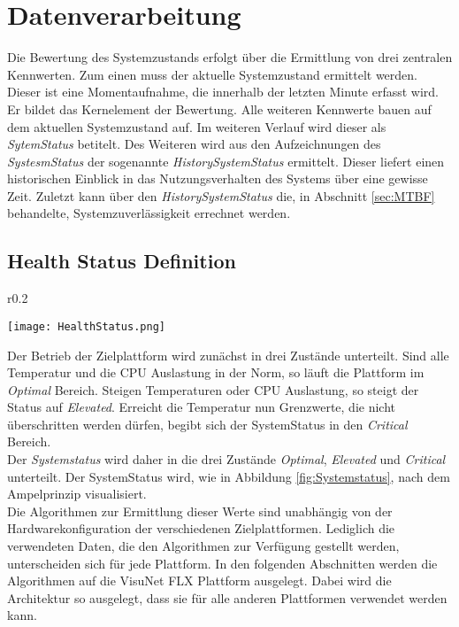 \newpage
\section{Datenverarbeitung}\label{sec:Datenverarbeitung}
Die Bewertung des Systemzustands erfolgt über die Ermittlung von drei zentralen Kennwerten. Zum einen muss der aktuelle Systemzustand ermittelt werden. Dieser ist eine Momentaufnahme, die innerhalb der letzten Minute erfasst wird. Er bildet das Kernelement der Bewertung. Alle weiteren Kennwerte bauen auf dem aktuellen Systemzustand auf. Im weiteren Verlauf wird dieser als \textit{SytemStatus} betitelt. Des Weiteren wird aus den Aufzeichnungen des \textit{SystesmStatus} der sogenannte \textit{HistorySystemStatus} ermittelt. Dieser liefert einen historischen Einblick in das Nutzungsverhalten des Systems über eine gewisse Zeit. Zuletzt kann über den \textit{HistorySystemStatus} die, in Abschnitt \ref{sec:MTBF} behandelte, Systemzuverlässigkeit errechnet werden.
\subsection{Health Status Definition}
\begin{wrapfigure}{r}{0.2\textwidth}
    \vspace{-1.2cm}
    \captionsetup{justification=centering,format=plain, font=small}
    \begin{center}
      \texttt{[image: HealthStatus.png]}
    \end{center}
    \vspace{-0.5cm}
    \caption{}
    \label{fig:Systemstatus}
    \vspace{-0.5cm}
\end{wrapfigure}
Der Betrieb der Zielplattform wird zunächst in drei Zustände unterteilt. Sind alle Temperatur und die CPU Auslastung in der Norm, so läuft die Plattform im \textit{Optimal} Bereich. Steigen Temperaturen oder CPU Auslastung, so steigt der Status auf \textit{Elevated}. Erreicht die Temperatur nun Grenzwerte, die nicht überschritten werden dürfen, begibt sich der SystemStatus in den \textit{Critical} Bereich.\\
Der \textit{Systemstatus} wird daher in die drei Zustände \textit{Optimal}, \textit{Elevated} und \textit{Critical} unterteilt. Der SystemStatus wird, wie in  Abbildung \ref{fig:Systemstatus}, nach dem Ampelprinzip visualisiert.\\
Die Algorithmen zur Ermittlung dieser Werte sind unabhängig von der Hardwarekonfiguration der verschiedenen Zielplattformen. Lediglich die verwendeten Daten, die den Algorithmen zur Verfügung gestellt werden, unterscheiden sich für jede Plattform. In den folgenden Abschnitten werden die Algorithmen auf die VisuNet FLX Plattform ausgelegt. Dabei wird die Architektur so ausgelegt, dass sie für alle anderen Plattformen verwendet werden kann.
\newpage
